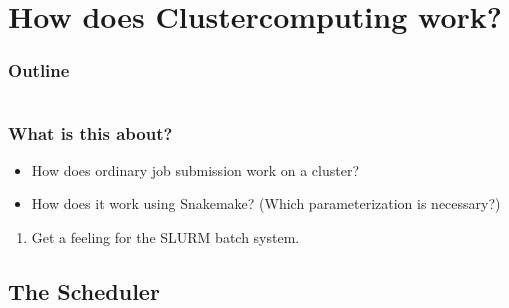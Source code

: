 \section{How does Clustercomputing work?}

\begin{frame}
    \frametitle{Outline}
    \begin{columns}[t]
        \begin{column}{.5\textwidth}
            \tableofcontents[sections={1-7},currentsection]
        \end{column}
        \begin{column}{.5\textwidth}
            \tableofcontents[sections={8-15},currentsection]
        \end{column}
    \end{columns}
\end{frame}

\begin{frame}
  \frametitle{What is this about?}
    \begin{question}
   	  \begin{itemize}
        \item How does ordinary job submission work on a cluster?
        \item How does it work using Snakemake? (Which parameterization is necessary?)
      \end{itemize}
   \end{question}
   \begin{docs}[Objectives]
   	 \begin{enumerate}
   	 	\item Get a feeling for the SLURM batch system.
     \end{enumerate}
   \end{docs}
\end{frame}


\subsection*{The \slurm Scheduler}

